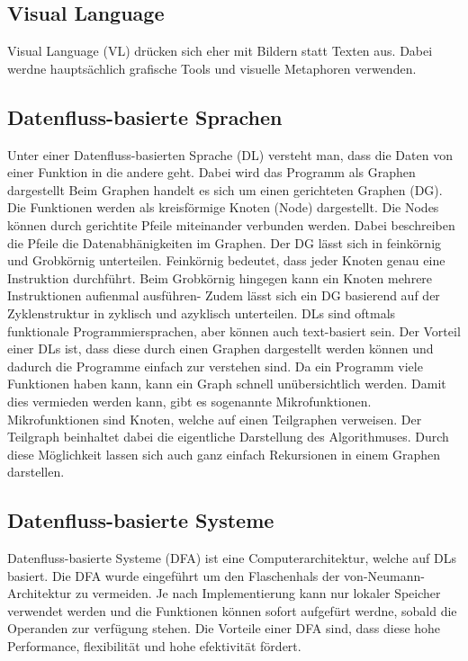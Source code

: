 \documentclass{article}
\begin{document}
    \subsection{Visual Language}
    Visual Language (VL) drücken sich eher mit Bildern statt Texten aus. \cite{5}
    Dabei werdne hauptsächlich grafische Tools und visuelle Metaphoren verwenden. \cite{16}
    \subsection{Datenfluss-basierte Sprachen}
    Unter einer Datenfluss-basierten Sprache (DL) versteht man, dass die Daten von einer Funktion in die andere geht. Dabei wird das Programm als Graphen dargestellt\cite{11}
    Beim Graphen handelt es sich um einen gerichteten Graphen (DG). Die Funktionen werden als kreisförmige Knoten (Node) dargestellt. Die Nodes können durch gerichtite Pfeile miteinander verbunden werden. Dabei beschreiben die Pfeile die Datenabhänigkeiten im Graphen.\cite{2}
    Der DG lässt sich in feinkörnig und Grobkörnig unterteilen. Feinkörnig bedeutet, dass jeder Knoten genau eine Instruktion durchführt. Beim Grobkörnig hingegen kann ein Knoten mehrere Instruktionen aufienmal ausführen-\cite{1}
    Zudem lässt sich ein DG basierend auf der Zyklenstruktur in zyklisch und azyklisch unterteilen. \cite{8}
    DLs sind oftmals funktionale Programmiersprachen, aber können auch text-basiert sein. \cite{2}
    Der Vorteil einer DLs ist, dass diese durch einen Graphen dargestellt werden können \cite{11} und dadurch die Programme einfach zur verstehen sind. \cite{6}
    Da ein Programm viele Funktionen haben kann, kann ein Graph schnell unübersichtlich werden. Damit dies vermieden werden kann, gibt es sogenannte Mikrofunktionen. Mikrofunktionen sind Knoten, welche auf einen Teilgraphen verweisen. Der Teilgraph beinhaltet dabei die eigentliche Darstellung des Algorithmuses. Durch diese Möglichkeit lassen sich auch ganz einfach Rekursionen in einem Graphen darstellen.\cite{11}
    \subsection{Datenfluss-basierte Systeme}
    Datenfluss-basierte Systeme (DFA) ist eine Computerarchitektur, welche auf DLs basiert. 
    Die DFA wurde eingeführt um den Flaschenhals der von-Neumann-Architektur zu vermeiden. Je nach Implementierung kann nur lokaler Speicher verwendet werden und die Funktionen können sofort aufgefürt werdne, sobald die Operanden zur verfügung stehen. \cite{8}
    Die Vorteile einer DFA sind, dass diese hohe Performance, flexibilität und hohe efektivität fördert. \cite{1}
    \newpage
\end{document}
